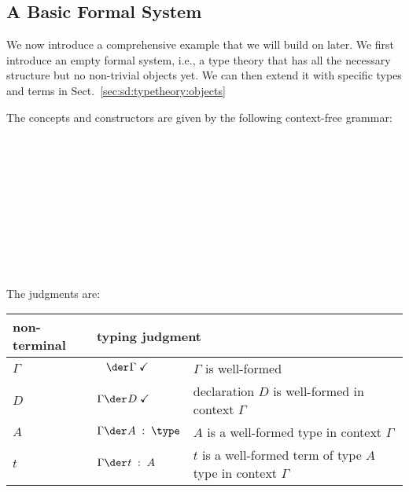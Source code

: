 \subsection{A Basic Formal System}

We now introduce a comprehensive example that we will build on later.
We first introduce an empty formal system, i.e., a type theory that has all the necessary structure but no non-trivial objects yet.
We can then extend it with specific types and terms in Sect.~\ref{sec:sd:typetheory:objects}

The concepts and constructors are given by the following context-free grammar:

\begin{commgrammar}
\\
\\
\\
\\
\\
\\
\\
\\
\\
\end{commgrammar}

The judgments are:
\begin{center}
	\begin{tabular}{|l|l|l|}
	\hline
	non-terminal & \multicolumn{2}{l|}{typing judgment} \\
	  \hline
		$\Gamma$ & $\;\;\;\iscont{}{\Gamma}$           & $\Gamma$ is well-formed\\
		$D$ & $\isdecl{}{\Gamma}{D}$        & declaration $D$ is well-formed in context $\Gamma$ \\\hline
		$A$ & $\oftype{}{\Gamma}{A}{\type}$ & $A$ is a well-formed type in context $\Gamma$ \\
		$t$ & $\oftype{}{\Gamma}{t}{A}$     & $t$ is a well-formed term of type $A$ type in context $\Gamma$ \\
		\hline
	\end{tabular}
\end{center}

